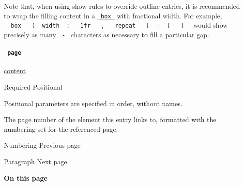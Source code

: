 Note that, when using show rules to override outline entries, it is
recommended to wrap the filling content in a
\href{/docs/reference/layout/box/}{\texttt{\ box\ }} with fractional
width. For example,
\texttt{\ }{\texttt{\ box\ }}\texttt{\ }{\texttt{\ (\ }}\texttt{\ width\ }{\texttt{\ :\ }}\texttt{\ }{\texttt{\ 1fr\ }}\texttt{\ }{\texttt{\ ,\ }}\texttt{\ }{\texttt{\ repeat\ }}\texttt{\ }{\texttt{\ {[}\ }}\texttt{\ -\ }{\texttt{\ {]}\ }}\texttt{\ }{\texttt{\ )\ }}\texttt{\ }
would show precisely as many \texttt{\ -\ } characters as necessary to
fill a particular gap.

\paragraph{\texorpdfstring{\texttt{\ page\ }}{ page }}\label{definitions-entry-page}

\href{/docs/reference/foundations/content/}{content}

{Required} {{ Positional }}

\label{definitions-entry-page-positional-tooltip}
Positional parameters are specified in order, without names.

The page number of the element this entry links to, formatted with the
numbering set for the referenced page.

\href{/docs/reference/model/numbering/}{\pandocbounded{}}

{ Numbering } { Previous page }

\href{/docs/reference/model/par/}{\pandocbounded{}}

{ Paragraph } { Next page }

\textbf{On this page}


